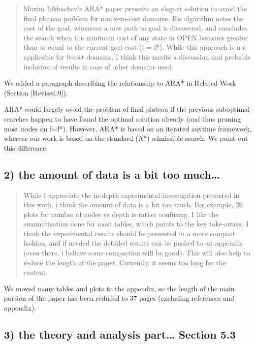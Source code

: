 \documentclass{article}
\begin{document}
\begin{quote}
 Maxim Likhachev's ARA* paper presents an elegant solution to
avoid the final plateau problem for non zero-cost domains. His
algorithm notes the cost of the goal, whenever a new path to goal is
discovered, and concludes the search when the minimum cost of any
state in OPEN becomes greater than or equal to the current goal cost
(f = f*). While this approach is not applicable for 0-cost domains, I
think this merits a discussion and probable inclusion of results in
case of other domains used.
\end{quote}

We added a paragraph describing the relationship to ARA* in Related Work (Section [Revised:9]).

ARA* could largely avoid the problem of final plateau if the previous suboptimal searches happen to
have found the optimal solution already (and thus pruning most nodes on f=f*). 
However, ARA* is based on an iterated anytime framework, whereas our work is based on the standard (A*) admissible search.
We point out this difference.


\subsection{2) the amount of data is a bit too much\ldots{}}
\label{sec:orgheadline15}

\begin{quote}
 While I appreciate the in-depth experimental investigation
presented in this work, i think the amount of data is a bit too much.
For example, 26 plots for number of nodes vs depth is rather
confusing. I like the summarization done for most tables, which points
to the key take-aways. I think the experimental results should be
presented in a more compact fashion, and if needed the detailed
results can be pushed to an appendix (even there, i believe some
compaction will be good). This will also help to reduce the length of
the paper. Currently, it seems too long for the content.
\end{quote}

We moved many tables and plots to the appendix, so the length of the main portion of the paper has been reduced to 37 pages (excluding references and appendix).

\subsection{\label{orgtarget1} 3) the theory and analysis part\ldots{} Section 5.3}
\label{sec:orgheadline16}
\end{document}
